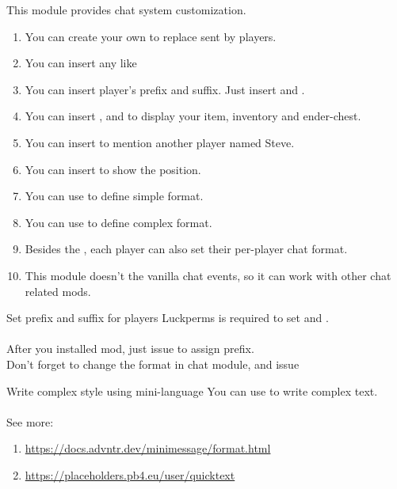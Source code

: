 This module provides chat system customization.

\begin{enumerate}
    \item You can create your own  to replace  sent by players.
    \item You can insert any  like 
    \item {You can insert player's prefix and suffix. Just insert  and .}
    \item You can insert ,  and  to display your item, inventory and ender-chest.
    \item You can insert  to mention another player named Steve.
    \item You can insert  to show the position.
    \item You can use  to define simple format.
    \item You can use  to define complex format.
    \item Besides the , each player can also set their per-player chat format.
    \item This module doesn't  the vanilla chat events, so it can work with other chat related mods.
\end{enumerate}

\begin{note}{Set prefix and suffix for players}
    Luckperms is required to set  and . \\
    \\
    After you installed  mod, just issue  to assign prefix. \\
    Don't forget to change the format in chat module, and issue 
\end{note}

\begin{tips}{Write complex style using mini-language}
    You can use  to write complex text.\\
    \\
    See more:
    \begin{enumerate}
        \item \url{https://docs.advntr.dev/minimessage/format.html}
        \item \url{https://placeholders.pb4.eu/user/quicktext}
    \end{enumerate}
\end{tips}

